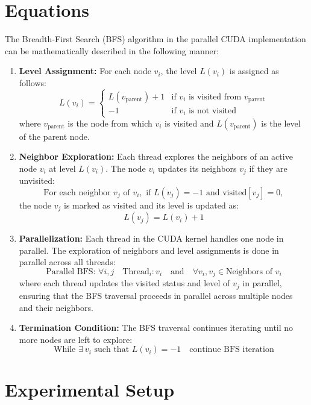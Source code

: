 \documentclass[a4paper,12pt]{article}
\begin{document}
\begin{center}
\section*{Equations}

The Breadth-First Search (BFS) algorithm in the parallel CUDA implementation can be mathematically described in the following manner:

\begin{enumerate}
    \item \textbf{Level Assignment:} For each node \( v_i \), the level \( L(v_i) \) is assigned as follows:
    \[
    L(v_i) = 
    \begin{cases} 
    L(v_{\text{parent}}) + 1 & \text{if } v_i \text{ is visited from } v_{\text{parent}} \\
    -1 & \text{if } v_i \text{ is not visited}
    \end{cases}
    \]
    where \( v_{\text{parent}} \) is the node from which \( v_i \) is visited and \( L(v_{\text{parent}}) \) is the level of the parent node.

    \item \textbf{Neighbor Exploration:} Each thread explores the neighbors of an active node \( v_i \) at level \( L(v_i) \). The node \( v_i \) updates its neighbors \( v_j \) if they are unvisited:
    \[
    \text{For each neighbor } v_j \text{ of } v_i, \text{ if } L(v_j) = -1 \text{ and } \text{visited}[v_j] = 0,
    \]
    the node \( v_j \) is marked as visited and its level is updated as:
    \[
    L(v_j) = L(v_i) + 1
    \]
    
    \item \textbf{Parallelization:} Each thread in the CUDA kernel handles one node in parallel. The exploration of neighbors and level assignments is done in parallel across all threads:
    \[
    \text{Parallel BFS: } \forall i, j \quad \text{Thread}_{i}: v_i \quad \text{and} \quad \forall v_i, v_j \in \text{Neighbors of } v_i
    \]
    where each thread updates the visited status and level of \( v_j \) in parallel, ensuring that the BFS traversal proceeds in parallel across multiple nodes and their neighbors.

    \item \textbf{Termination Condition:} The BFS traversal continues iterating until no more nodes are left to explore:
    \[
    \text{While } \exists \ v_i \text{ such that } L(v_i) = -1 \quad \text{continue BFS iteration}
    \]
\end{enumerate}
\newpage
\section*{ Experimental Setup}


\end{center}
\end{document}
